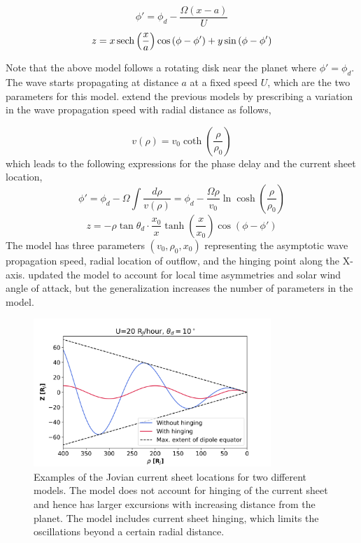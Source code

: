 \begin{equation}
    \phi' = \phi_d - \frac{\Omega \left(x - a\right)}{U}
\end{equation}
\begin{equation}
    z = x \operatorname{sech} \left( \frac{x}{a} \right) \cos\left(\phi - \phi' \right) + y \sin\left(\phi - \phi' \right)  
\end{equation}

Note that the above model follows a rotating disk near the planet where $\phi'=\phi_d$. The wave starts propagating at distance $a$ at a fixed speed $U$, which are the two parameters for this model.  extend the previous models by prescribing a variation in the wave propagation speed with radial distance as follows,

\begin{equation}
    v(\rho) = v_0 \coth \left(\frac{\rho}{\rho_0} \right)
\end{equation}
which leads to the following expressions for the phase delay and the current sheet location,
\begin{equation}
    \phi' = \phi_d - \Omega \int \frac{d\rho}{v(\rho)} = \phi_d - \frac{\Omega \rho}{v_0} \ln \cosh \left( \frac{\rho}{\rho_0} \right) 
\end{equation}
\begin{equation}
    z = -\rho \tan\theta_d \cdot \frac{x_0}{x} \tanh\left(\frac{x}{x_0} \right) \cos\left( \phi - \phi'\right) 
    \label{eqn:khurana1992}
\end{equation}
The  model has three parameters $(v_0, \rho_0, x_0)$ representing the asymptotic wave propagation speed, radial location of outflow, and the hinging point along the X-axis.  updated the model to account for local time asymmetries and solar wind angle of attack, but the generalization increases the number of parameters in the model. 

\begin{figure}
    \centering
    \includegraphics[width=0.8\textwidth]{images6/example-hinging.png}
    \caption{Examples of the Jovian current sheet locations for two different models. The \protect{} model does not account for hinging of the current sheet and hence has larger excursions with increasing distance from the planet. The \protect{} model includes current sheet hinging, which limits the oscillations beyond a certain radial distance.}
    \label{fig:example-hinging}
\end{figure}

